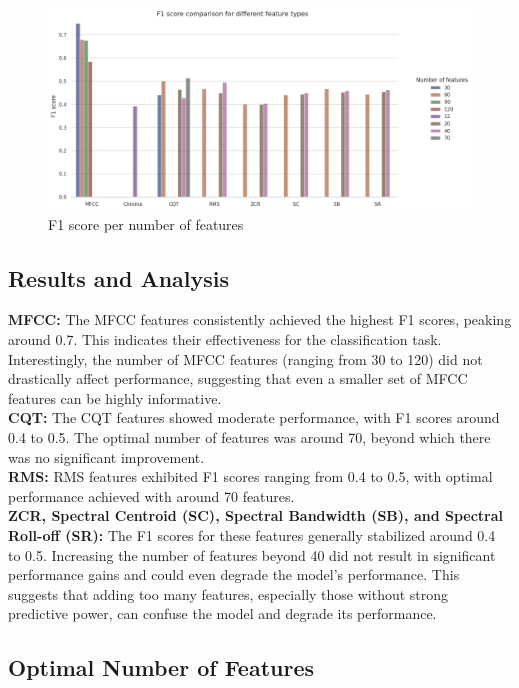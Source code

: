 \begin{figure}[htbp]
    \centering
    \includegraphics[width=.8\textwidth]{../images/n_feature_per_type.png}
    \caption{F1 score per number of features}
    \label{fig:n_feature_per_type}
\end{figure}

\subsection{Results and Analysis}

\textbf{MFCC:} The MFCC features consistently achieved the highest F1 scores, peaking around 0.7.
This indicates their effectiveness for the classification task. Interestingly, the number of MFCC features (ranging from 30 to 120)
did not drastically affect performance, suggesting that even a smaller set of MFCC features can be highly informative.\\
\textbf{CQT:} The CQT features showed moderate performance, with F1 scores around 0.4 to 0.5. The optimal number of features was around 70,
beyond which there was no significant improvement.\\
\textbf{RMS:} RMS features exhibited F1 scores ranging from 0.4 to 0.5, with optimal performance achieved with around 70 features.\\
\textbf{ZCR, Spectral Centroid (SC), Spectral Bandwidth (SB), and Spectral Roll-off (SR):}
The F1 scores for these features generally stabilized around 0.4 to 0.5.
Increasing the number of features beyond 40 did not result in significant performance gains and could even degrade the model's performance.
This suggests that adding too many features, especially those without strong predictive power, can confuse the model and degrade its performance.

\subsection{Optimal Number of Features}

